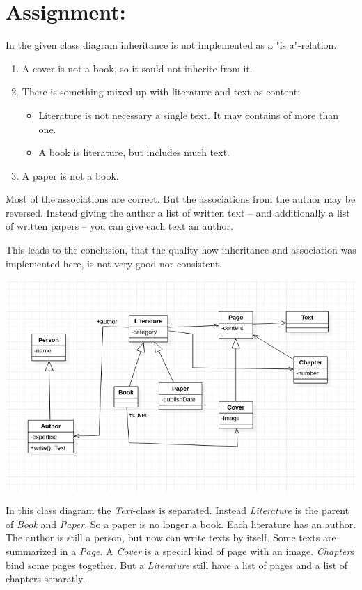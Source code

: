 \documentclass[a4paper,12pt,oneside]{scrreprt}
\begin{document}
	\section{Assignment:}
    
    In the given class diagram inheritance is not implemented as a "is a"-relation. 
    
    \begin{enumerate}
        \item A cover is not a book, so it sould not inherite from it.
        \item There is something mixed up with literature and text as content:
        \begin{itemize}
            \item Literature is not necessary a single text. It may contains of more than one.
            \item A book is literature, but includes much text.
        \end{itemize}
        \item A paper is not a book.
    \end{enumerate}

    Most of the associations are correct. But the associations from the author may be reversed. Instead giving the author a list of written text -- and additionally a list of written papers -- you can give each text an author.
    
    This leads to the conclusion, that the quality how inheritance and
    association was implemented here, is not very good nor consistent.
    
    \includegraphics[width=\textwidth]{../uml/2_2.png}
    
    In this class diagram the \textit{Text}-class is separated. Instead \textit{Literature} is the parent of \textit{Book} and \textit{Paper}. So a paper is no longer a book. Each literature has an author. The author is still a person, but now can write texts by itself. Some texts are summarized in a \textit{Page}. A \textit{Cover} is a special kind of page with an image. \textit{Chapter}s bind some pages together. But a \textit{Literature} still have a list of pages and a list of chapters separatly.
    
\end{document}
